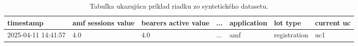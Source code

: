 \begin{table}[H]
\caption{Tabuľka ukazujúca príklad riadku zo syntetického datasetu.}
\begin{tabular}{ |p{2cm}|p{1.7cm}|p{1.6cm}|p{0.3cm}|p{2cm}|p{2cm}|p{2cm}|  }
\hline
 timestamp & amf sessions value & bearers active value & ... & application & lot type & current uc \\
 \hline
 2025-04-11 14:41:57  & 4.0  & 4.0 & ... & amf & registration & uc1  \\
 \hline
\end{tabular}
\label{table:dataset}
\end{table}